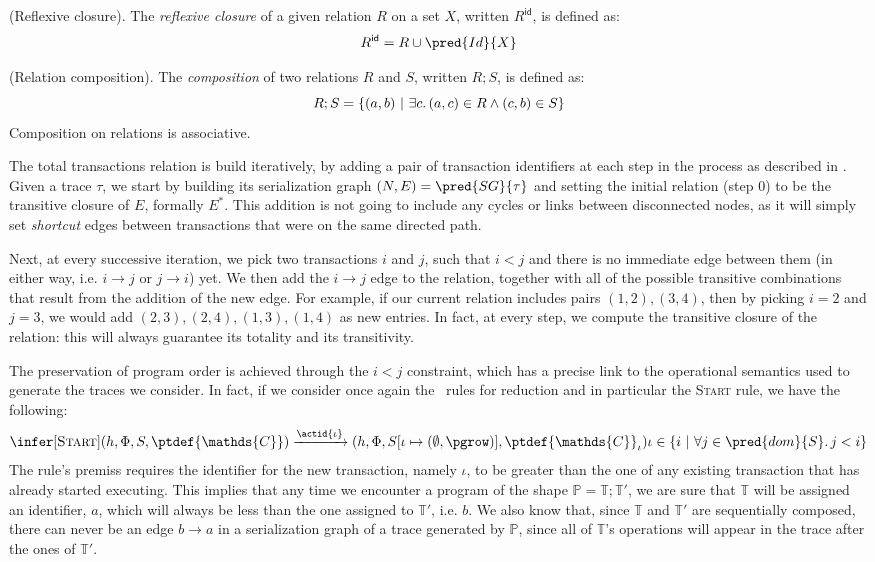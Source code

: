 \begin{defn}
	(Reflexive closure).
	The \emph{reflexive closure} of a given relation $R$ on a set $X$, written $R^\mathsf{id}$, is defined as:
	\[
		R^\mathsf{id} = R \cup \pred{Id}{X}
	\]
\end{defn}

\begin{defn}
	(Relation composition).
	The \emph{composition} of two relations $R$ and $S$, written $R ; S$, is defined as:
	\[
		R ; S = \{ (a, b)\ |\ \exists c \ldotp (a, c) \in R \land (c, b) \in S \}
	\]
	Composition on relations is associative.
\end{defn}

The total transactions relation is build iteratively, by adding a pair of transaction identifiers at each step in the process as described in \cite{ceroneAlgebraic}. Given a trace $\tau$, we start by building its serialization graph $(N, E) = \pred{SG}{\tau}$ and setting the initial relation (step $0$) to be the transitive closure of $E$, formally $E^*$. This addition is not going to include any cycles or links between disconnected nodes, as it will simply set \textit{shortcut} edges between transactions that were on the same directed path.

Next, at every successive iteration, we pick two transactions $i$ and $j$, such that $i < j$ and there is no immediate edge between them (in either way, i.e. $i \rightarrow j$ or $j \rightarrow i$) yet. We then add the $i \rightarrow j$ edge to the relation, together with all of the possible transitive combinations that result from the addition of the new edge. For example, if our current relation includes pairs $(1, 2), (3, 4)$, then by picking $i = 2$ and $j = 3$, we would add $(2, 3), (2, 4), (1, 3), (1, 4)$ as new entries. In fact, at every step, we compute the transitive closure of the relation: this will always guarantee its totality and its transitivity.

The preservation of program order is achieved through the $i < j$ constraint, which has a precise link to the operational semantics used to generate the traces we consider. In fact, if we consider once again the \tpl\ rules for reduction and in particular the \textsc{Start} rule, we have the following:
\[
	\infer[\textsc{Start}]
	{
		(h, \Phi, S, \ptdef{\mathds{C}})
		\xrightarrow{\actid{\iota}}
		(h, \Phi, S[\iota \mapsto (\emptyset, \pgrow)], \ptdef{\mathds{C}}_\iota)
	}
	{
		\iota \in \{ i\ |\ \forall j \in \pred{dom}{S} \ldotp j < i \}
	}
\]
The rule's premiss requires the identifier for the new transaction, namely $\iota$, to be greater than the one of any existing transaction that has already started executing. This implies that any time we encounter a program of the shape $\mathds{P} = \mathds{T} ; \mathds{T}'$, we are sure that $\mathds{T}$ will be assigned an identifier, $a$, which will always be less than the one assigned to $\mathds{T}'$, i.e. $b$. We also know that, since $\mathds{T}$ and $\mathds{T}'$ are sequentially composed, there can never be an edge $b \rightarrow a$ in a serialization graph of a trace generated by $\mathds{P}$, since all of $\mathds{T}$'s operations will appear in the trace after the ones of $\mathds{T}'$.

